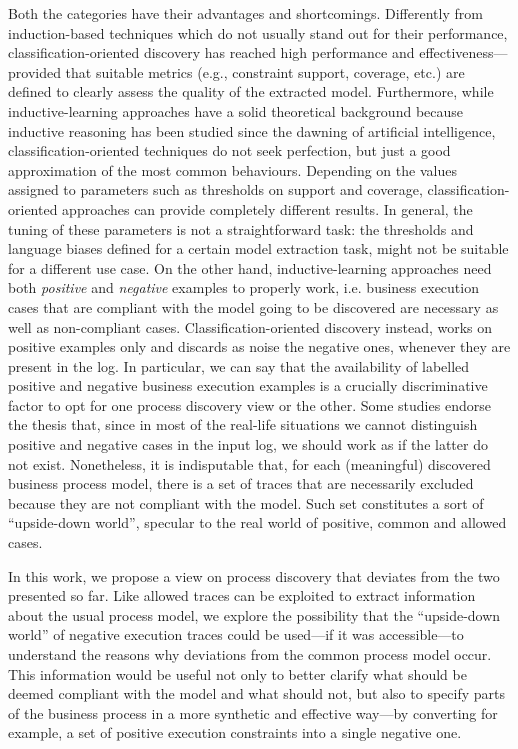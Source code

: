 Both the categories have their advantages and shortcomings. Differently from induction-based techniques which do not usually stand out for their performance, classification-oriented discovery has reached high performance and effectiveness---provided that suitable metrics (e.g., constraint support, coverage, etc.) are defined to clearly assess the quality of the extracted model. 
Furthermore, while inductive-learning approaches have a solid theoretical background because inductive reasoning has been studied since the dawning of artificial intelligence, classification-oriented techniques do not seek perfection, but just a good approximation of the most common behaviours.
Depending on the values assigned to parameters such as thresholds on support and coverage, classification-oriented approaches can provide completely different results. In general, the tuning of these parameters is not a straightforward task: the thresholds and language biases defined for a certain model extraction task, might not be suitable for a different use case. 
On the other hand, inductive-learning approaches need both \emph{positive} and \emph{negative} examples to properly work, i.e. business execution cases that are compliant with the model going to be discovered are necessary as well as non-compliant cases. Classification-oriented discovery instead, works on positive examples only and discards as noise the negative ones, whenever they are present in the log. %
In particular, we can say that the availability of labelled positive and negative business execution examples is a crucially discriminative factor to opt for one process discovery view or the other.  Some studies endorse the thesis that, since in most of the real-life situations we cannot distinguish positive and negative cases in the input log, we should work as if the latter do not exist. Nonetheless, it is indisputable that, for each (meaningful) discovered business process model, there is a set of traces that are necessarily excluded because they are not compliant with the model. Such set constitutes a sort of ``upside-down world'', specular to the real world of positive, common and allowed cases. 


In this work, we propose a view on process discovery that deviates from the two presented so far. 
Like allowed traces can be exploited to extract information about the usual process model, we explore the possibility that the ``upside-down world'' of negative execution traces could be used---if it was accessible---to understand the reasons why deviations from the common process model occur. This information would be useful not only to better clarify what should be deemed compliant with the model and what should not, but also to specify parts of the business process in a more synthetic and effective way---by converting for example, a set of positive execution constraints into a single negative one.  

